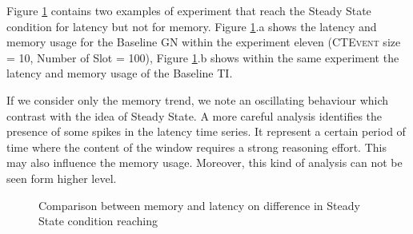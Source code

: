 Figure \ref{fig:level3-not-steady-naive-graph-en11} contains two examples of experiment that reach the Steady State condition for latency but not for memory. Figure \ref{fig:level3-not-steady-naive-graph-en11}.a shows the latency and memory usage for the Baseline GN within the experiment eleven (\textsc{CTEvent} size = 10, Number of Slot = 100), Figure \ref{fig:level3-not-steady-naive-graph-en11}.b shows within the same experiment the latency and memory usage of the Baseline TI. 

If we consider only the memory trend, we note an oscillating behaviour which contrast with the idea of Steady State. A more careful analysis identifies the presence of some spikes in the latency time series. It represent a certain period of time where the content of the window requires a strong reasoning effort. This may also influence the memory usage. Moreover, this kind of analysis can not be seen form higher level. 

\begin{figure}[tbh]
  \centering
  \caption{Comparison between memory and latency on difference in Steady State condition reaching} 
  \label{fig:level3-not-steady-naive-graph-en11}
\end{figure}

